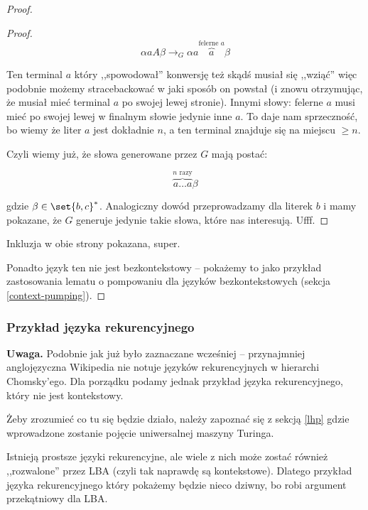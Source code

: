 \begin{proof}
\begin{proof}
        \[
            \alpha a A \beta \rightarrow_G \alpha a \overbrace{a}^{\text{felerne \(a\)}} \beta 
        \]
        
        Ten terminal \(a\) który ,,spowodował'' konwersję też skądś musiał się ,,wziąć'' więc podobnie możemy stracebackować w jaki sposób on powstał (i znowu otrzymując, że musiał mieć terminal \(a\) po swojej lewej stronie). Innymi słowy: felerne \(a\) musi mieć po swojej lewej w finalnym słowie jedynie inne \(a\). To daje nam sprzeczność, bo wiemy że liter \(a\) jest dokładnie \(n\), a ten terminal znajduje się na miejscu \(\geq n\). 
        
        Czyli wiemy już, że słowa generowane przez \(G\) mają postać:
        
        \[ 
            \overbrace{a \dots a}^{\text{\(n\) razy}} \beta  
        \]
        
        gdzie \(\beta \in \set{b, c}^*\). Analogiczny dowód przeprowadzamy dla literek \(b\) i mamy pokazane, że \(G\) generuje jedynie takie słowa, które nas interesują. Ufff.
    \end{proof}
    
    Inkluzja w obie strony pokazana, super. 
    
    Ponadto język ten nie jest bezkontekstowy -- pokażemy to jako przykład zastosowania lematu o pompowaniu dla języków bezkontekstowych (sekcja \ref{context-pumping}).
\end{proof}

\subsubsection{Przykład języka rekurencyjnego}
\label{recursive-example}

\textbf{Uwaga.} Podobnie jak już było zaznaczane wcześniej -- przynajmniej anglojęzyczna Wikipedia nie notuje języków rekurencyjnych w hierarchi Chomsky'ego. Dla porządku podamy jednak przykład języka rekurencyjnego, który nie jest kontekstowy. 

Żeby zrozumieć co tu się będzie działo, należy zapoznać się z sekcją \ref{lhp} gdzie wprowadzone zostanie pojęcie uniwersalnej maszyny Turinga. 

Istnieją prostsze języki rekurencyjne, ale wiele z nich może zostać również ,,rozwalone'' przez LBA (czyli tak naprawdę są kontekstowe). Dlatego przykład języka rekurencyjnego który pokażemy będzie nieco dziwny, bo robi argument przekątniowy dla LBA.

